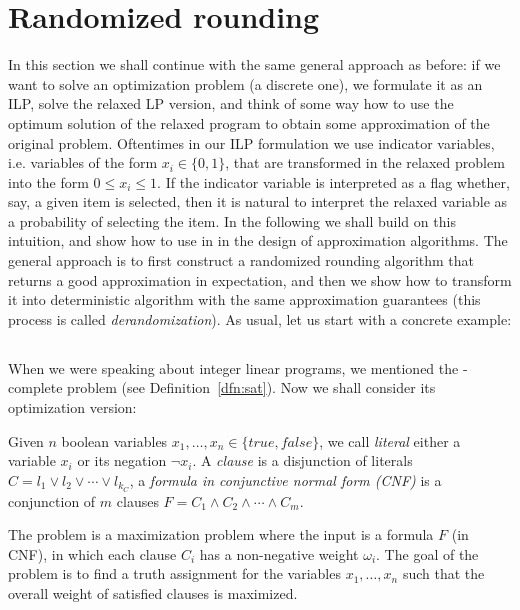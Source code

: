 \section{Randomized rounding}

In this section we shall continue with the same general approach as before: if we want to solve an optimization 
problem
(a discrete one), we formulate it as an ILP, solve the relaxed LP version, and  think of some way how to use
the optimum solution of the relaxed program to obtain some approximation of the original problem.
Oftentimes in our ILP formulation we use indicator variables, i.e. variables of the form $x_i\in\{0,1\}$,
that are transformed in the relaxed problem into the form $0\le x_i\le1$. If the indicator variable is interpreted
as a flag whether, say, a given item is selected, then it is natural to interpret the relaxed variable as a 
probability of selecting the item. In the following we shall build on this intuition, and show how to use in 
in the design of approximation algorithms. The general approach is to first construct a randomized rounding 
algorithm that returns a good approximation in expectation, and then we show how to transform it into
deterministic algorithm with the same approximation guarantees (this process is called {\em derandomization}).
As usual, let us start with a concrete example:


\subsection*{\maxsat}

\noindent
When we were speaking about integer linear programs, we mentioned the \NP-complete problem \sat 
(see Definition~\ref{dfn:sat}). Now we shall consider its optimization version:
\begin{framed}
\begin{dfn}
  \label{dfn:maxsat}
  Given $n$ boolean variables $x_1,\ldots,x_n\in\{true,false\}$, we call {\em literal}
  either a variable $x_i$ or its negation $\neg{x_i}$. A {\em clause} is a disjunction
  of literals $C=l_1\vee l_2\vee\cdots\vee l_{k_C}$, a {\em formula in conjunctive normal form (CNF)}
  is a conjunction of $m$ clauses  $F=C_1\wedge C_2\wedge\cdots\wedge C_m$.

  \noindent
  The problem \maxsat is a maximization problem where the input is a formula $F$ (in CNF), in which
  each clause $C_i$ has a non-negative weight $\omega_i$. The goal of the problem is to find a truth assignment
  for the variables $x_1,\ldots,x_n$ such that the overall weight of satisfied clauses is maximized.
\end{dfn}
\end{framed}


